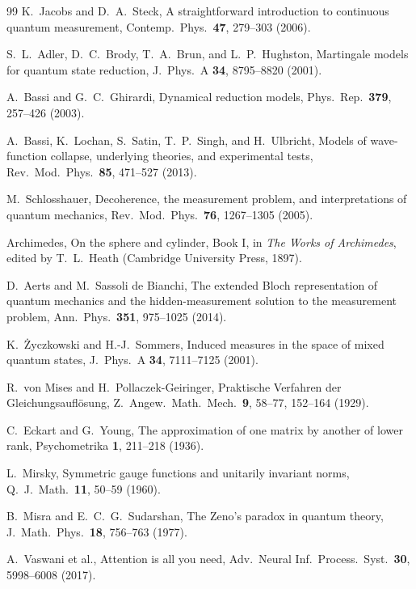 \documentclass[aps,pra,onecolumn,superscriptaddress,nofootinbib,10pt]{revtex4-2}
\theoremstyle{definition}
\theoremstyle{remark}
\begin{document}
\begin{thebibliography}{99}
 K.~Jacobs and D.~A.~Steck, A straightforward introduction to continuous quantum measurement, Contemp.\ Phys.\ \textbf{47}, 279--303 (2006).

 S.~L.~Adler, D.~C.~Brody, T.~A.~Brun, and L.~P.~Hughston, Martingale models for quantum state reduction, J.\ Phys.\ A \textbf{34}, 8795--8820 (2001).

 A.~Bassi and G.~C.~Ghirardi, Dynamical reduction models, Phys.\ Rep.\ \textbf{379}, 257--426 (2003).

 A.~Bassi, K.~Lochan, S.~Satin, T.~P.~Singh, and H.~Ulbricht, Models of wave-function collapse, underlying theories, and experimental tests, Rev.\ Mod.\ Phys.\ \textbf{85}, 471--527 (2013).

 M.~Schlosshauer, Decoherence, the measurement problem, and interpretations of quantum mechanics, Rev.\ Mod.\ Phys.\ \textbf{76}, 1267--1305 (2005).

 Archimedes, On the sphere and cylinder, Book I, in \emph{The Works of Archimedes}, edited by T.~L.~Heath (Cambridge University Press, 1897).

 D.~Aerts and M.~Sassoli de Bianchi, The extended Bloch representation of quantum mechanics and the hidden-measurement solution to the measurement problem, Ann.\ Phys.\ \textbf{351}, 975--1025 (2014).

 K.~\.Zyczkowski and H.-J.~Sommers, Induced measures in the space of mixed quantum states, J.\ Phys.\ A \textbf{34}, 7111--7125 (2001).

 R.~von Mises and H.~Pollaczek-Geiringer, Praktische Verfahren der Gleichungsaufl\"osung, Z.\ Angew.\ Math.\ Mech.\ \textbf{9}, 58--77, 152--164 (1929).

 C.~Eckart and G.~Young, The approximation of one matrix by another of lower rank, Psychometrika \textbf{1}, 211--218 (1936).

 L.~Mirsky, Symmetric gauge functions and unitarily invariant norms, Q.\ J.\ Math.\ \textbf{11}, 50--59 (1960).

 B.~Misra and E.~C.~G.~Sudarshan, The Zeno's paradox in quantum theory, J.\ Math.\ Phys.\ \textbf{18}, 756--763 (1977).

 A.~Vaswani et al., Attention is all you need, Adv.\ Neural Inf.\ Process.\ Syst.\ \textbf{30}, 5998--6008 (2017).


\end{thebibliography}
\end{document}
